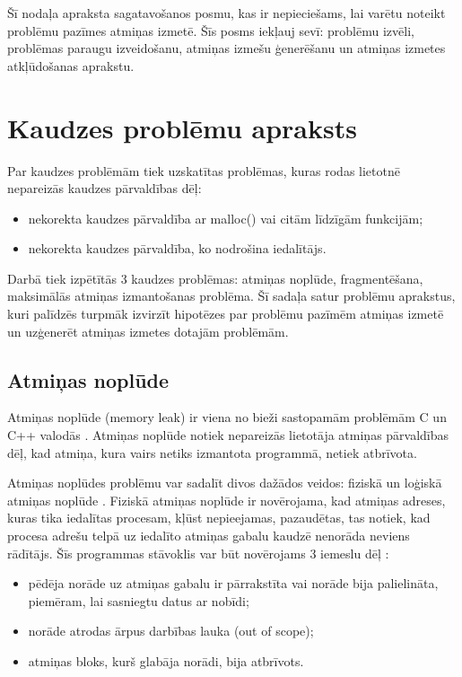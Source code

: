﻿Šī nodaļa apraksta sagatavošanos posmu, kas ir nepieciešams, lai varētu noteikt problēmu pazīmes atmiņas izmetē.
Šīs posms iekļauj sevī: problēmu izvēli, problēmas paraugu izveidošanu, atmiņas izmešu ģenerēšanu un atmiņas izmetes atkļūdošanas aprakstu.


\section{Kaudzes problēmu apraksts}
 \label{sec:problems}
Par kaudzes problēmām tiek uzskatītas problēmas, kuras rodas lietotnē nepareizās kaudzes pārvaldības dēļ: 
\begin{itemize}
\item nekorekta kaudzes pārvaldība ar malloc() vai citām līdzīgām funkcijām;
\item nekorekta kaudzes pārvaldība, ko nodrošina iedalītājs.
\end{itemize}
Darbā tiek izpētītās 3 kaudzes problēmas: atmiņas noplūde, fragmentēšana, maksimālās atmiņas izmantošanas problēma.
Šī sadaļa satur problēmu aprakstus, kuri palīdzēs turpmāk izvirzīt hipotēzes par problēmu pazīmēm atmiņas izmetē un uzģenerēt atmiņas izmetes dotajām problēmām.
\subsection{Atmiņas noplūde}

Atmiņas noplūde (memory leak) ir viena no bieži sastopamām problēmām C un C++ valodās \cite{atparv}.
Atmiņas noplūde notiek nepareizās lietotāja atmiņas pārvaldības dēļ, kad atmiņa, kura vairs netiks izmantota programmā, netiek atbrīvota.

Atmiņas noplūdes problēmu var sadalīt divos dažādos veidos: fiziskā un loģiskā atmiņas noplūde \cite{JMMR}.
Fiziskā atmiņas noplūde ir novērojama, kad atmiņas adreses, kuras tika iedalītas procesam,  kļūst nepieejamas, pazaudētas, tas notiek, kad procesa adrešu telpā uz iedalīto atmiņas gabalu kaudzē nenorāda neviens rādītājs.
Šīs programmas stāvoklis var būt novērojams 3 iemeslu dēļ \cite{JMMR}:
\begin{itemize}
\item pēdēja norāde uz atmiņas gabalu ir pārrakstīta vai norāde bija palielināta, piemēram, lai sasniegtu datus ar nobīdi;
\item norāde atrodas ārpus darbības lauka (out of scope);
\item atmiņas bloks, kurš glabāja norādi, bija atbrīvots.
\end{itemize}

